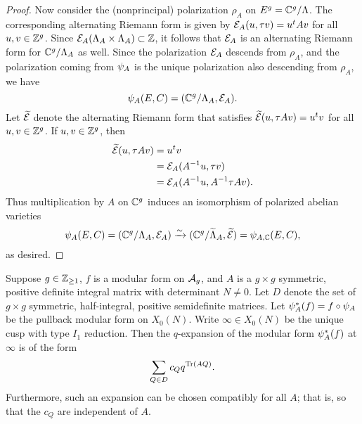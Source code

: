 \documentclass{amsart}
\begin{document}
\begin{proof}
Now consider the (nonprincipal) polarization $\rho_A$ on $E^g = \mathbb{C}^g/\Lambda$. The corresponding alternating Riemann form is given by $\mathcal{E}_A(u,\tau v) = u^tAv$ for all $u,v \in \mathbb{Z}^g$. Since $\mathcal{E}_A(\Lambda_A \times \Lambda_A) \subset \mathbb{Z}$, it follows that $\mathcal{E}_A$ is an alternating Riemann form for $\mathbb{C}^g/\Lambda_A$ as well. 
Since the polarization $\mathcal{E}_A$ descends from $\rho_A$, and the polarization coming from $\psi_{A}$ is the unique polarization also descending from $\rho_A$, we have
\[
  \psi_{A}(E,C) = (\mathbb{C}^g/\Lambda_A, \mathcal{E}_A).
\]
Let $\widetilde{\mathcal{E}}$ denote the %
alternating Riemann form %
that satisfies %
$\widetilde{\mathcal{E}}(u, \tau A v) = u^tv$ for all $u,v \in \mathbb{Z}^g$. If $u, v \in \mathbb{Z}^g$, then
\begin{align*}
  \widetilde{\mathcal{E}}(u, \tau A v) &= u^tv \\
                          &= \mathcal{E}_A(A^{-1}u, \tau v) \\
                          &= \mathcal{E}_{A}(A^{-1}u, A^{-1}\tau Av).
\end{align*}
Thus multiplication by $A$ on $\mathbb{C}^g$ induces an isomorphism of polarized abelian varieties
\[
  \psi_{A}(E,C) = (\mathbb{C}^g/\Lambda_A, \mathcal{E}_A) \xrightarrow{\sim} (\mathbb{C}^g/\widetilde{\Lambda}_A, \widetilde{\mathcal{E}}) = {\psi}_{A, \mathbb{C}}(E,C),
\]
as desired.
\end{proof}

\begin{lemma}\label{lemma:q-expansion}
  Suppose $g \in \mathbb{Z}_{\ge 1}$, $f$ is a modular form on $\mathcal{A}_g$, and $A$ is a $g \times g$ symmetric, positive definite integral matrix with determinant $N \neq 0$. Let $D$ denote the set of $g \times g$ symmetric, half-integral, positive semidefinite matrices. Let $\psi_{A}^*(f) = f \circ \psi_{A}$ be the pullback modular form on $X_0(N)$. Write $\infty \in X_0(N)$ be the unique cusp with type $I_1$ reduction. Then the $q$-expansion of the modular form $\psi_{A}^*(f)$ at $\infty$ is of the form
  \[
    \sum_{Q \in D} c_Q q^{\operatorname{Tr}(AQ)}.
  \]
  Furthermore, such an expansion can be chosen compatibly for all $A$; that is, so that the $c_Q$ are independent of $A$.
\end{lemma}
\end{document}
